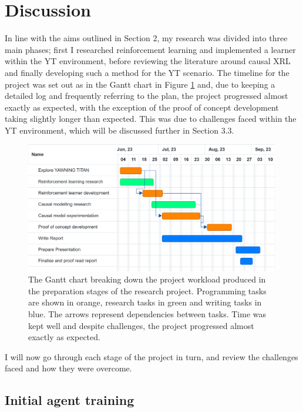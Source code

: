 \documentclass{article}
\begin{document}
\section{Discussion} 

In line with the aims outlined in Section 2, my research was divided into three main phases; first I researched reinforcement learning and implemented a learner within the YT environment, before reviewing the literature around causal XRL and finally developing such a method for the YT scenario. The timeline for the project was set out as in the Gantt chart in Figure \ref{fig:gantt} and, due to keeping a detailed log and frequently referring to the plan, the project progressed almost exactly as expected, with the exception of the proof of concept development taking slightly longer than expected. This was due to challenges faced within the YT environment, which will be discussed further in Section 3.3.

\begin{figure}[htp]
    \centering
    \includegraphics[width=0.99\textwidth]{Images/gantt.png}
    \caption{The Gantt chart breaking down the project workload produced in the preparation stages of the research project. Programming tasks are shown in orange, research tasks in green and writing tasks in blue. The arrows represent dependencies between tasks. Time was kept well and despite challenges, the project progressed almost exactly as expected. }
    \label{fig:gantt}
\end{figure}

\noindent I will now go through each stage of the project in turn, and review the challenges faced and how they were overcome.  

\subsection{Initial agent training}
\end{document}
